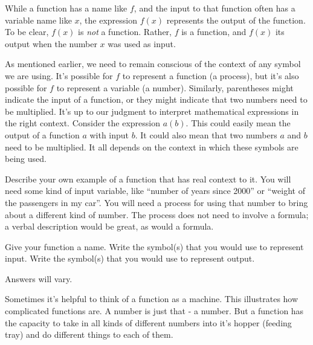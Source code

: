 	\begin{pccspecialcomment} 
		While a function has a name like $f$, and the input to that function often
		has a variable name like $x$, the expression $f(x)$ represents the output of
		the function. To be clear, $f(x)$ is \emph{not} a function. Rather, $f$ is a
		function, and $f(x)$ its output when the number $x$ was used as input.
	\end{pccspecialcomment}
	As mentioned earlier, we need to remain conscious of the context of any symbol we
	are using. It's possible for $f$ to represent a function (a process), but it's also
	possible for $f$ to represent a variable (a number). Similarly, parentheses might
	indicate the input of a function, or they might indicate that two numbers need to
	be multiplied. It's up to our judgment to interpret mathematical expressions in the
	right context. Consider the expression $a(b)$. This could easily mean the output of
	a function $a$ with input $b$. It could also mean that two numbers $a$ and $b$ need
	to be multiplied. It all depends on the context in which these symbols are being used.
	\begin{doyouunderstand}
		\begin{problem}
		Describe your own example of a function that has real context to it. You will
		need some kind of input variable, like ``number of years since 2000'' or
		``weight of the passengers in my car''. You will need a process for using that
		number to bring about a different kind of number. The process does not need to
		involve a formula; a verbal description would be great, as would a formula.
		
		Give your function a name. Write the symbol(s) that you would use to represent
		input. Write the symbol(s) that you would use to represent output.
		\begin{shortsolution}
			Answers will vary.
		\end{shortsolution}
		\end{problem}
	\end{doyouunderstand}
	Sometimes it's helpful to think of a function as a machine. 
	This illustrates how complicated functions are. A number is just that - a number.
	But a function has the capacity to take in all kinds of different numbers into
	it's hopper (feeding tray) and do different things to each of them.
	

